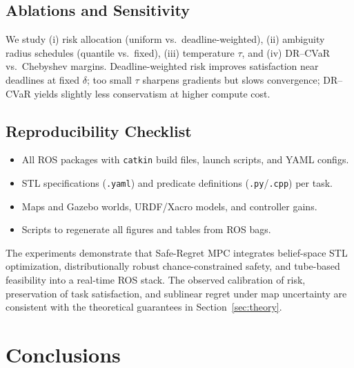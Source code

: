 \documentclass[journal]{IEEEtran}
\theoremstyle{definition}
\begin{document}
\subsection{Ablations and Sensitivity}
We study (i) risk allocation (uniform vs.\ deadline-weighted),
(ii) ambiguity radius schedules (quantile vs.\ fixed), (iii) temperature $\tau$, and
(iv) DR--CVaR vs.\ Chebyshev margins.
Deadline-weighted risk improves satisfaction near deadlines at fixed $\delta$;
too small $\tau$ sharpens gradients but slows convergence; DR--CVaR yields slightly less conservatism at higher compute cost.

\subsection{Reproducibility Checklist}
\begin{itemize}
\item All ROS packages with \texttt{catkin} build files, launch scripts, and YAML configs.
\item STL specifications (\texttt{.yaml}) and predicate definitions (\texttt{.py}/\texttt{.cpp}) per task.
\item Maps and Gazebo worlds, URDF/Xacro models, and controller gains.
\item Scripts to regenerate all figures and tables from ROS bags.
\end{itemize}

\medskip
The experiments demonstrate that Safe-Regret MPC integrates belief-space STL optimization,
distributionally robust chance-constrained safety, and tube-based feasibility into a real-time ROS stack.
The observed calibration of risk, preservation of task satisfaction, and sublinear regret under map uncertainty
are consistent with the theoretical guarantees in Section~\ref{sec:theory}.
 

\section{Conclusions}






 
\end{document}
